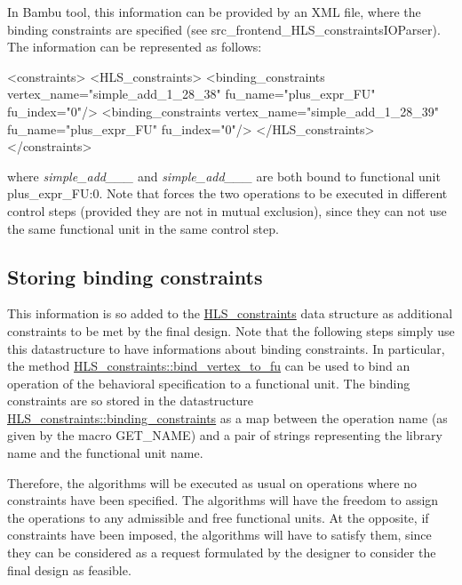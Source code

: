 In Bambu tool, this information can be provided by an X\+ML file, where the binding constraints are specified (see src\+\_\+frontend\+\_\+\+H\+L\+S\+\_\+constraints\+I\+O\+Parser). The information can be represented as follows\+: \begin{DoxyVerb}  <constraints>
    <HLS_constraints>
      <binding_constraints vertex_name="simple_add_1_28_38" 
                           fu_name="plus_expr_FU" fu_index="0"/>
      <binding_constraints vertex_name="simple_add_1_28_39" 
                           fu_name="plus_expr_FU" fu_index="0"/>
    </HLS_constraints>
  </constraints>
\end{DoxyVerb}
 where {\itshape simple\+\_\+add\+\_\+\_\+\_} and {\itshape simple\+\_\+add\+\_\+\_\+\_} are both bound to functional unit plus\+\_\+expr\+\_\+\+FU\+:0. Note that forces the two operations to be executed in different control steps (provided they are not in mutual exclusion), since they can not use the same functional unit in the same control step.\hypertarget{src_HLS_binding_constraints_page_sec_binding_constraints_in_hls}{}\subsection{Storing binding constraints}\label{src_HLS_binding_constraints_page_sec_binding_constraints_in_hls}
This information is so added to the \hyperlink{classHLS__constraints}{H\+L\+S\+\_\+constraints} data structure as additional constraints to be met by the final design. Note that the following steps simply use this datastructure to have informations about binding constraints. In particular, the method \hyperlink{classHLS__constraints_a059b4544182407ed8966208698ab2428}{H\+L\+S\+\_\+constraints\+::bind\+\_\+vertex\+\_\+to\+\_\+fu} can be used to bind an operation of the behavioral specification to a functional unit. The binding constraints are so stored in the datastructure \hyperlink{classHLS__constraints_aa0ec5bd7ca34862b3786089e8360b63e}{H\+L\+S\+\_\+constraints\+::binding\+\_\+constraints} as a map between the operation name (as given by the macro G\+E\+T\+\_\+\+N\+A\+ME) and a pair of strings representing the library name and the functional unit name.

Therefore, the algorithms will be executed as usual on operations where no constraints have been specified. The algorithms will have the freedom to assign the operations to any admissible and free functional units. At the opposite, if constraints have been imposed, the algorithms will have to satisfy them, since they can be considered as a request formulated by the designer to consider the final design as feasible. 